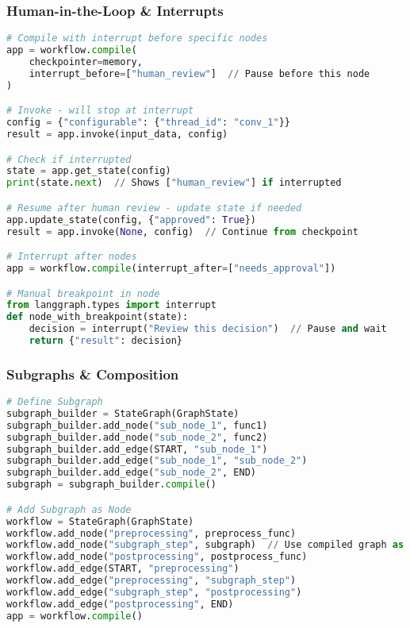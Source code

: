\begin{frame}[fragile]\frametitle{Human-in-the-Loop \& Interrupts}
      \begin{lstlisting}[language=python,basicstyle=\tiny]
# Compile with interrupt before specific nodes
app = workflow.compile(
    checkpointer=memory,
    interrupt_before=["human_review"]  // Pause before this node
)

# Invoke - will stop at interrupt
config = {"configurable": {"thread_id": "conv_1"}}
result = app.invoke(input_data, config)

# Check if interrupted
state = app.get_state(config)
print(state.next)  // Shows ["human_review"] if interrupted

# Resume after human review - update state if needed
app.update_state(config, {"approved": True})
result = app.invoke(None, config)  // Continue from checkpoint

# Interrupt after nodes
app = workflow.compile(interrupt_after=["needs_approval"])

# Manual breakpoint in node
from langgraph.types import interrupt
def node_with_breakpoint(state):
    decision = interrupt("Review this decision")  // Pause and wait
    return {"result": decision}
  \end{lstlisting}
\end{frame}

\begin{frame}[fragile]\frametitle{Subgraphs \& Composition}
      \begin{lstlisting}[language=python,basicstyle=\tiny]
# Define Subgraph
subgraph_builder = StateGraph(GraphState)
subgraph_builder.add_node("sub_node_1", func1)
subgraph_builder.add_node("sub_node_2", func2)
subgraph_builder.add_edge(START, "sub_node_1")
subgraph_builder.add_edge("sub_node_1", "sub_node_2")
subgraph_builder.add_edge("sub_node_2", END)
subgraph = subgraph_builder.compile()

# Add Subgraph as Node
workflow = StateGraph(GraphState)
workflow.add_node("preprocessing", preprocess_func)
workflow.add_node("subgraph_step", subgraph)  // Use compiled graph as node
workflow.add_node("postprocessing", postprocess_func)
workflow.add_edge(START, "preprocessing")
workflow.add_edge("preprocessing", "subgraph_step")
workflow.add_edge("subgraph_step", "postprocessing")
workflow.add_edge("postprocessing", END)
app = workflow.compile()
  \end{lstlisting}
\end{frame}

